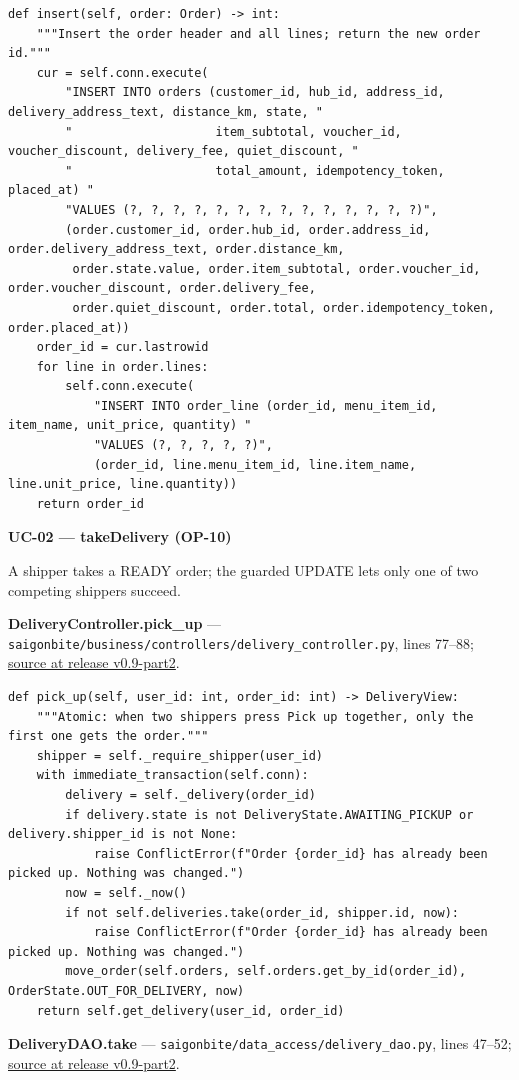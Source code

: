 \begin{lstlisting}
def insert(self, order: Order) -> int:
    """Insert the order header and all lines; return the new order id."""
    cur = self.conn.execute(
        "INSERT INTO orders (customer_id, hub_id, address_id, delivery_address_text, distance_km, state, "
        "                    item_subtotal, voucher_id, voucher_discount, delivery_fee, quiet_discount, "
        "                    total_amount, idempotency_token, placed_at) "
        "VALUES (?, ?, ?, ?, ?, ?, ?, ?, ?, ?, ?, ?, ?, ?)",
        (order.customer_id, order.hub_id, order.address_id, order.delivery_address_text, order.distance_km,
         order.state.value, order.item_subtotal, order.voucher_id, order.voucher_discount, order.delivery_fee,
         order.quiet_discount, order.total, order.idempotency_token, order.placed_at))
    order_id = cur.lastrowid
    for line in order.lines:
        self.conn.execute(
            "INSERT INTO order_line (order_id, menu_item_id, item_name, unit_price, quantity) "
            "VALUES (?, ?, ?, ?, ?)",
            (order_id, line.menu_item_id, line.item_name, line.unit_price, line.quantity))
    return order_id
\end{lstlisting}
\textbf{UC-02 --- takeDelivery (OP-10)}

A shipper takes a READY order; the guarded UPDATE lets only one of two competing shippers succeed.

\textbf{DeliveryController.pick\_up} --- \texttt{saigonbite/\allowbreak{}business/\allowbreak{}controllers/\allowbreak{}delivery\_\allowbreak{}controller.\allowbreak{}py}, lines 77--88; \href{\TargetRepo\detokenize{/blob/v0.9-part2/saigonbite/business/controllers/delivery_controller.py#L77-L88}}{source at release v0.9-part2}.

\begin{lstlisting}
def pick_up(self, user_id: int, order_id: int) -> DeliveryView:
    """Atomic: when two shippers press Pick up together, only the first one gets the order."""
    shipper = self._require_shipper(user_id)
    with immediate_transaction(self.conn):
        delivery = self._delivery(order_id)
        if delivery.state is not DeliveryState.AWAITING_PICKUP or delivery.shipper_id is not None:
            raise ConflictError(f"Order {order_id} has already been picked up. Nothing was changed.")
        now = self._now()
        if not self.deliveries.take(order_id, shipper.id, now):
            raise ConflictError(f"Order {order_id} has already been picked up. Nothing was changed.")
        move_order(self.orders, self.orders.get_by_id(order_id), OrderState.OUT_FOR_DELIVERY, now)
    return self.get_delivery(user_id, order_id)
\end{lstlisting}
\textbf{DeliveryDAO.take} --- \texttt{saigonbite/\allowbreak{}data\_\allowbreak{}access/\allowbreak{}delivery\_\allowbreak{}dao.\allowbreak{}py}, lines 47--52; \href{\TargetRepo\detokenize{/blob/v0.9-part2/saigonbite/data_access/delivery_dao.py#L47-L52}}{source at release v0.9-part2}.

